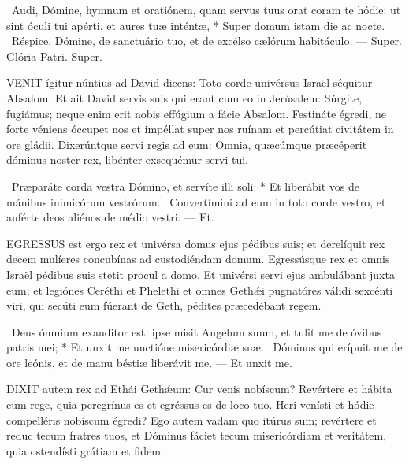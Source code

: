 \R\ Audi, Dómine, hymnum et oratiónem, quam servus tuus orat coram te hódie: ut sint óculi tui apérti, et aures tuæ inténtæ, * Super domum istam die ac nocte. \V\ Réspice, Dómine, de sanctuário tuo, et de excélso cælórum habitáculo. --- Super. Glória Patri. Super.




\lettrine[lines=2]{V}{ENIT} ígitur núntius ad David dicens: Toto corde univérsus Israël séquitur Absalom. Et ait David servis suis qui erant cum eo in Jerúsalem: Súrgite, fugiámus; neque enim erit nobis effúgium a fácie Absalom. Festináte égredi, ne forte véniens óccupet nos et impéllat super nos ruínam et percútiat civitátem in ore gládii. Dixerúntque servi regis ad eum: Omnia, quæcúmque præcéperit dóminus noster rex, libénter exsequémur servi tui.

\R\ Præparáte corda vestra Dómino, et servíte illi soli: * Et liberábit vos de mánibus inimicórum vestrórum. \V\ Convertímini ad eum in toto corde vestro, et auférte deos aliénos de médio vestri. --- Et.


\lettrine[lines=2]{E}{GRESSUS} est ergo rex et univérsa domus ejus pédibus suis; et derelíquit rex decem mulíeres concubínas ad custodiéndam domum. Egressúsque rex et omnis Israël pédibus suis stetit procul a domo. Et univérsi servi ejus ambulábant juxta eum; et legiónes Ceréthi et Phelethi et omnes Gethǽi pugnatóres válidi sexcénti viri, qui secúti eum fúerant de Geth, pédites præcedébant regem.

\R\ Deus ómnium exauditor est: ipse misit Angelum suum, et tulit me de óvibus patris mei; * Et unxit me unctióne misericórdiæ suæ. \V\ Dóminus qui erípuit me de ore leónis, et de manu béstiæ liberávit me. --- Et unxit me.



\lettrine[lines=2]{D}{IXIT} autem rex ad Ethái Gethǽum: Cur venis nobíscum? Revértere et hábita cum rege, quia peregrínus es et egréssus es de loco tuo. Heri venísti et hódie compelléris nobíscum égredi? Ego autem vadam quo itúrus sum; revértere et reduc tecum fratres tuos, et Dóminus fáciet tecum misericórdiam et veritátem, quia ostendísti grátiam et fidem.

